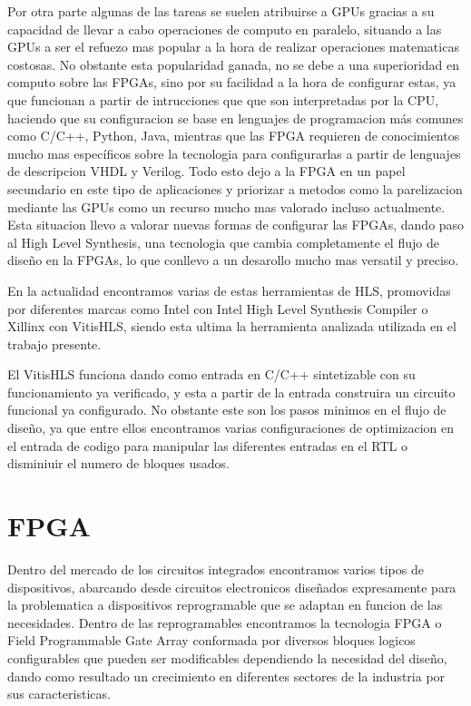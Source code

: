 \documentclass[11pt,spanish,listoffigures,listoftables]{tfgetsinf}
\begin{document}
   Por otra parte algunas de las tareas se suelen atribuirse a GPUs gracias a su
   capacidad de llevar a cabo operaciones de computo en paralelo, situando a las
   GPUs a ser el refuezo mas popular a la hora de realizar operaciones
   matematicas costosas. No obstante esta popularidad ganada, no se debe a una
   superioridad en computo sobre las FPGAs, sino por su facilidad a la hora de
   configurar estas, ya que funcionan a partir de intrucciones que que son
   interpretadas por la CPU, haciendo que su configuracion se base en lenguajes
   de programacion más comunes como C/C++, Python, Java, mientras que las FPGA
   requieren de conocimientos mucho mas específicos sobre la tecnologia para
   configurarlas a partir de lenguajes de descripcion VHDL y Verilog.   Todo
   esto dejo a la FPGA en un papel secundario en este tipo de aplicaciones y
   priorizar a metodos como la parelizacion mediante las GPUs como un recurso
   mucho mas valorado incluso actualmente. Esta situacion llevo a valorar nuevas
   formas de configurar las FPGAs, dando paso al High Level Synthesis, una
   tecnologia que cambia completamente el flujo de diseño en la FPGAs, lo que
   conllevo a un desarollo mucho mas versatil y preciso. 
   
   En la actualidad encontramos varias de estas herramientas de HLS, promovidas
   por diferentes marcas como Intel con Intel High Level Synthesis Compiler o
   Xillinx con VitisHLS, siendo esta ultima la herramienta analizada utilizada
   en el trabajo presente.
   
   El VitisHLS funciona dando como entrada en C/C++ sintetizable con su
   funcionamiento ya verificado, y esta a partir de la entrada construira un
   circuito funcional ya configurado. No obstante este son los pasos minimos en
   el flujo de diseño, ya que entre ellos encontramos varias configuraciones de
   optimizacion en el entrada de codigo para manipular las diferentes entradas
   en el RTL o disminiuir el numero de bloques usados.

   
\chapter{FPGA}

  Dentro del mercado de los circuitos integrados encontramos varios tipos de
  dispositivos, abarcando desde circuitos electronicos diseñados expresamente
  para la problematica a dispositivos reprogramable que se adaptan en funcion de
  las necesidades. Dentro de las reprogramables encontramos la tecnologia FPGA o
  Field Programmable Gate Array conformada por diversos bloques logicos
  configurables que pueden ser modificables dependiendo la necesidad del diseño,
  dando como resultado un crecimiento en diferentes sectores de la industria por
  sus caracteristicas.
  
\end{document}
